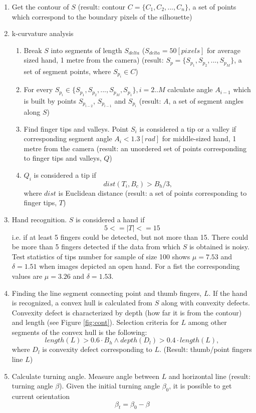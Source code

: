 \documentclass[a4paper, 12pt]{article}
\begin{document}
\begin{enumerate}
\item Get the contour of $S$ (result: contour ${C} = \{C_1, C_2, ..., C_n\}$, a set of points which correspond to the boundary pixels of the silhouette)
\item k-curvature analysis
    \begin{enumerate}
        \item Break $S$ into segments of length $S_{delta}$ ($S_{delta} = 50 [pixels]$ for average sized hand, 1 metre from the camera) (result: ${S_p} = \{S_{p_1}, S_{p_2}, ..., S_{p_M}\}$, a set of segment points, where $S_{p_i} \in C$)
        \item For every $S_{p_i} \in \{S_{p_1}, S_{p_2}, ..., S_{p_M}, S_{p_1}\}, i = 2..M$ calculate angle $A_{i-1}$ which is built by points $S_{p_{i-2}}$, $S_{p_{i-1}}$ and $S_{p_i}$ (result: $A$, a set of segment angles along $S$)
        \item Find finger tips and valleys. Point $S_i$ is considered a tip or a valley if corresponding segment angle $A_i < 1.3 [rad]$ for middle-sized hand, 1 metre from the camera (result: an unordered set of points corresponding to finger tips and valleys, $Q$)
        \item $Q_i$ is considered a tip if 
\[
dist(T_i, B_c) > B_h / 3,
\]
where $dist$ is Euclidean distance (result: a set of points corresponding to finger tips, $T$)
    \end{enumerate}
\item Hand recognition. $S$ is considered a hand if 
\[
5 <= \left|T\right| <= 15
\] i.e. if at least 5 fingers could be detected, but not more than 15. There could be more than 5 fingers detected if the data from which $S$ is obtained is noisy. \\
Test statistics of tips number for sample of size 100 shows $\mu = 7.53$ and $\delta = 1.51$ when images depicted an open hand. For a fist the corresponding values are $\mu = 3.26$ and $\delta = 1.53$.
\item Finding the line segment connecting point and thumb fingers, $L$. If the hand is recognized, a convex hull is calculated from $S$ along with convexity defects. Convexity defect is characterized by depth (how far it is from the contour) and length (see Figure \ref{fig:cont}). Selection criteria for $L$ among other segments of the convex hull is the following: 
\[
    length(L) > 0.6 \cdot B_h \land depth(D_l) > 0.4 \cdot length(L),
\]
where $D_l$ is convexity defect corresponding to $L$. (Result: thumb/point fingers line $L$)
\item Calculate turning angle. Measure angle between $L$ and horizontal line (result: turning angle $\beta$). Given the initial turning angle $\beta_0$, it is possible to get current orientation 
\[
\beta_t = \beta_0 - \beta
\]

\end{enumerate}
\end{document}
